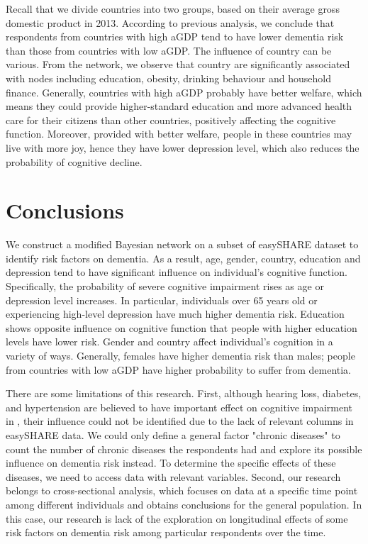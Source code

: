 \documentclass[11pt,twoside]{article}
\numberwithin{Theorem}{section}
\numberwithin{Definition}{section}
\numberwithin{Lemma}{section}
\numberwithin{Algorithm}{section}
\numberwithin{equation}{section}
\begin{document}
Recall that we divide countries into two groups, based on their average gross domestic product in 2013. According to previous analysis, we conclude that respondents from countries with high aGDP tend to have lower dementia risk than those from countries with low aGDP. The influence of country can be various. From the network, we observe that country are significantly associated with nodes including education, obesity, drinking behaviour and household finance. Generally, countries with high aGDP probably have better welfare, which means they could provide higher-standard education and more advanced health care for their citizens than other countries, positively affecting the cognitive function. Moreover, provided with better welfare, people in these countries may live with more joy, hence they have lower depression level, which also reduces the probability of cognitive decline.

\clearpage

\section{Conclusions}

We construct a modified Bayesian network on a subset of easySHARE dataset to identify risk factors on dementia. As a result, age, gender, country, education and depression tend to have significant influence on individual's cognitive function. Specifically, the probability of severe cognitive impairment rises as age or depression level increases. In particular, individuals over 65 years old or experiencing high-level depression have much higher dementia risk. Education shows opposite influence on cognitive function that people with higher education levels have lower risk. Gender and country affect individual's cognition in a variety of ways. Generally, females have higher dementia risk than males; people from countries with low aGDP have higher probability to suffer from dementia.

There are some limitations of this research. First, although hearing loss, diabetes, and hypertension are believed to have important effect on cognitive impairment in \cite{livingston2017dementia}, their influence could not be identified due to the lack of relevant columns in easySHARE data. We could only define a general factor "chronic diseases" to count the number of chronic diseases the respondents had and explore its possible influence on dementia risk instead. To determine the specific effects of these diseases, we need to access data with relevant variables. Second, our research belongs to cross-sectional analysis, which focuses on data at a specific time point among different individuals and obtains conclusions for the general population. In this case, our research is lack of the exploration on longitudinal effects of some risk factors on dementia risk among particular respondents over the time.
\end{document}
